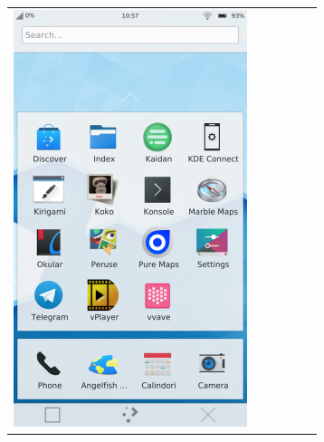 \documentclass[xcolor=table]{beamer}
\begin{document}
\begin{frame}
\begin{center}
\begin{tabular}{llllll}
	\includegraphics[height=.4\textheight]{..//img/Bweb01-environnement/plasmaphone.png} \\
\end{tabular}
\end{center}

\end{frame}
\end{document}
